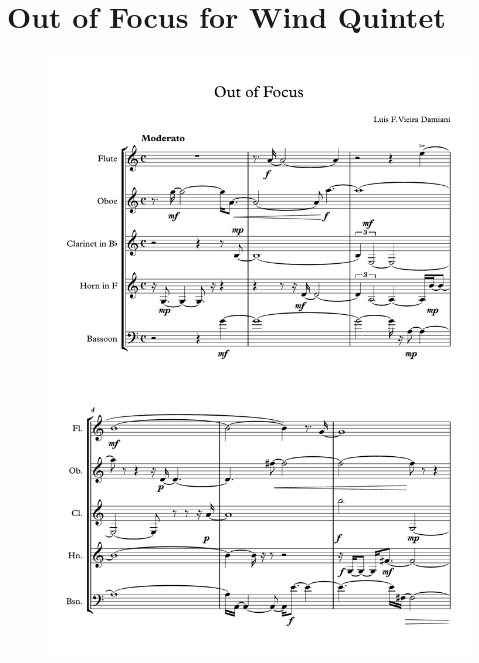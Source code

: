 \chapter{Out of Focus for Wind Quintet}
\vspace{-2em}

\begin{figure}[H]
    \centering
	\includegraphics[width=6.5in]{figures/Out_of_Focus_1.pdf}
\end{figure}

